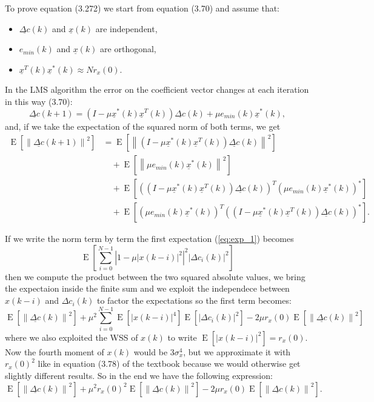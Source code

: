 \documentclass{article}
\renewcommand{\vec}[1]{\underline{#1}}
\newcommand{\E}[1]{\operatorname{E}\left[#1\right]}
\newcommand{\norm}[1]{\left\lVert#1\right\rVert}
\newcommand{\abs}[1]{\left|#1\right|}
\begin{document}
To prove equation (3.272) we start from equation (3.70) and assume
that:
\begin{itemize}
\item $\vec{\Delta c}(k)$ and $\vec{x}(k)$ are independent, 
\item $e_{min}(k)$ and $\vec{x}(k)$ are orthogonal, 
\item $\vec{x}^T(k)\vec{x}^*(k) \approx Nr_x(0)$.
\end{itemize}
In the LMS algorithm the error on the coefficient vector changes at each iteration in this way (3.70):
\begin{equation*}
  \vec{\Delta c}(k+1) = \left( I - \mu\vec{x}^*(k)\vec{x}^T(k) \right) \vec{\Delta c}(k) + \mu e_{min}(k)\vec{x}^*(k) , 
\end{equation*}
and, if we take the expectation of the squared norm of both terms, we get
\begin{align}
  \E{\norm{\vec{\Delta c}(k+1)}^2} %
  &= \E{\norm{\left( I - \mu\vec{x}^*(k)\vec{x}^T(k) \right) \vec{\Delta c}(k)}^2}
  \label{eq:exp_1} \\
  & \quad + \E{\norm{\mu e_{min}(k)\vec{x}^*(k)}^2}
  \label{eq:exp_2} \\
  & \quad + \E{\left(\left( I - \mu\vec{x}^*(k)\vec{x}^T(k) \right)\vec{\Delta c}(k)\right)^T\left(\mu e_{min}(k)\vec{x}^*(k)\right)^*}
  \label{eq:exp_3} \\
  & \quad + \E{\left(\mu e_{min}(k)\vec{x}^*(k)\right)^T\left(\left( I - \mu\vec{x}^*(k) \vec{x}^T(k)\right) \vec{\Delta c}(k)\right)^*}
  \label{eq:exp_4} .
\end{align}

If we write the norm term by term the first expectation
(\ref{eq:exp_1}) becomes
\[ \E{\sum_{i=0}^{N-1}\abs{1 - \mu\abs{x(k-i)}^2}^2\abs{\Delta c_i(k)}^2} \]
then we compute the product between the two squared absolute values,
we bring the expectaion inside the finite sum and we exploit the
independece between $x(k-i)$ and $\Delta c_i(k)$ to factor the
expectations so the first term becomes:
\[ \E{\norm{\vec{\Delta c}(k)}^2} +
\mu^2\sum_{i=0}^{N-1}\E{\abs{x(k-i)}^4}\E{\abs{\Delta c_i(k)}^2} - 2\mu
r_x(0)\E{\norm{\vec{\Delta c}(k)}^2}
\]
where we also exploited the WSS of $x(k)$ to write $\E{\abs{x(k-i)}^2}
= r_x(0)$. Now the fourth moment of $x(k)$ would be $3\sigma^4_x$, but
we approximate it with $r_x(0)^2$ like in equation (3.78) of the
textbook because we would otherwise get slightly different results.
So in the end we have the following expression:
\begin{equation}
\E{\norm{\vec{\Delta c}(k)}^2} +
\mu^2r_x(0)^2\E{\norm{\vec{\Delta c}(k)}^2} - 2\mu
r_x(0)\E{\norm{\vec{\Delta c}(k)}^2} .
\label{eq:c_final_1}
\end{equation}
\end{document}
